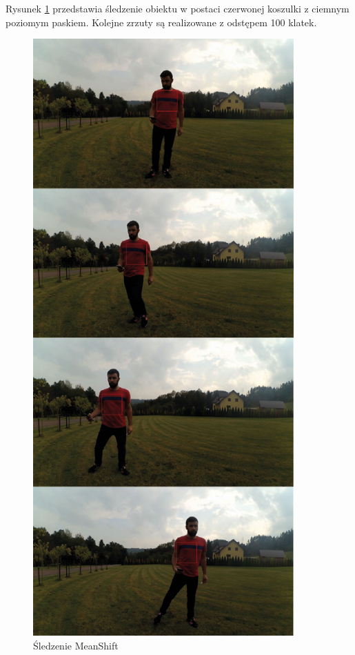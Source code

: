 Rysunek \ref{fig:meanshift_prog} przedstawia śledzenie obiektu w postaci czerwonej koszulki z ciemnym poziomym paskiem. Kolejne zrzuty są realizowane z odstępem 100 klatek.
 
\begin{figure}[]
	\centering
	\includegraphics[width=10cm]{3_meanshift.jpg}
	\caption{Śledzenie MeanShift}
	\label{fig:meanshift_prog}
\end{figure}

